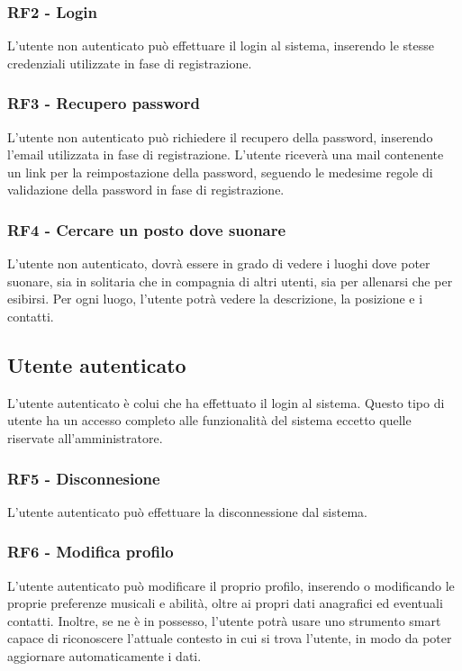 \documentclass[12pt, a4paper]{article}
\begin{document}
\subsubsection{RF2 - Login}

L'utente non autenticato può effettuare il login al sistema, inserendo le stesse credenziali utilizzate in fase di registrazione.

\subsubsection{RF3 - Recupero password}

L'utente non autenticato può richiedere il recupero della password, inserendo l'email utilizzata in fase di registrazione. L'utente riceverà una mail contenente un link per la reimpostazione della password, seguendo le medesime regole di validazione della password in fase di registrazione.

\subsubsection{RF4 - Cercare un posto dove suonare}

L'utente non autenticato, dovrà essere in grado di vedere i luoghi dove poter suonare, sia in solitaria che in compagnia di altri utenti, sia per allenarsi che per esibirsi. Per ogni luogo, l'utente potrà vedere la descrizione, la posizione e i contatti.

\subsection{Utente autenticato}

L'utente autenticato è colui che ha effettuato il login al sistema. Questo tipo di utente ha un accesso completo alle funzionalità del sistema eccetto quelle riservate all'amministratore.

\subsubsection{RF5 - Disconnesione}

L'utente autenticato può effettuare la disconnessione dal sistema.

\subsubsection{RF6 - Modifica profilo}

L'utente autenticato può modificare il proprio profilo, inserendo o modificando le proprie preferenze musicali e abilità, oltre ai propri dati anagrafici ed eventuali contatti. Inoltre, se ne è in possesso, l'utente potrà usare uno strumento smart capace di riconoscere l'attuale contesto in cui si trova l'utente, in modo da poter aggiornare automaticamente i dati.
\end{document}
